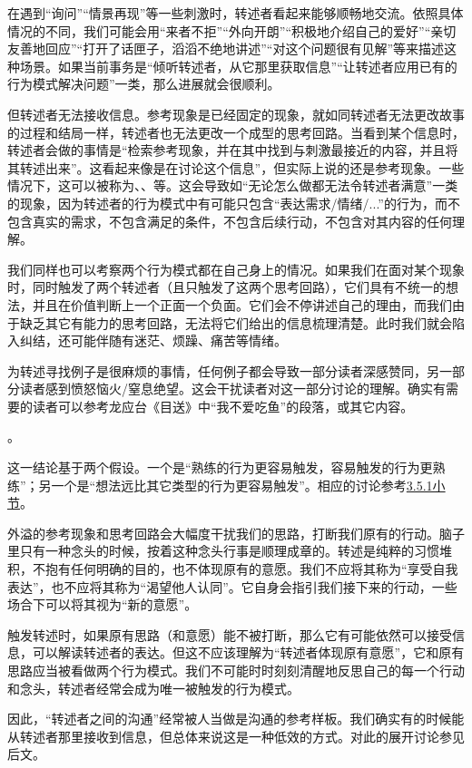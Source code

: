 \begin{explain}
在遇到“询问”“情景再现”等一些刺激时，转述者看起来能够顺畅地交流。依照具体情况的不同，我们可能会用“来者不拒”“外向开朗”“积极地介绍自己的爱好”“亲切友善地回应”“打开了话匣子，滔滔不绝地讲述”“对这个问题很有见解”等来描述这种场景。如果当前事务是“倾听转述者，从它那里获取信息”“让转述者应用已有的行为模式解决问题”一类，那么进展就会很顺利。

但转述者无法接收信息。参考现象是已经固定的现象，就如同转述者无法更改故事的过程和结局一样，转述者也无法更改一个成型的思考回路。当看到某个信息时，转述者会做的事情是“检索参考现象，并在其中找到与刺激最接近的内容，并且将其转述出来”。这看起来像是在讨论这个信息”，但实际上说的还是参考现象。一些情况下，这可以被称为、、等。这会导致如“无论怎么做都无法令转述者满意”一类的现象，因为转述者的行为模式中有可能只包含“表达需求/情绪/...”的行为，而不包含真实的需求，不包含满足的条件，不包含后续行动，不包含对其内容的任何理解。

我们同样也可以考察两个行为模式都在自己身上的情况。如果我们在面对某个现象时，同时触发了两个转述者（且只触发了这两个思考回路），它们具有不统一的想法，并且在价值判断上一个正面一个负面。它们会不停讲述自己的理由，而我们由于缺乏其它有能力的思考回路，无法将它们给出的信息梳理清楚。此时我们就会陷入纠结，还可能伴随有迷茫、烦躁、痛苦等情绪。

为转述寻找例子是很麻烦的事情，任何例子都会导致一部分读者深感赞同，另一部分读者感到愤怒恼火/窒息绝望。这会干扰读者对这一部分讨论的理解。确实有需要的读者可以参考龙应台《目送》中“我不爱吃鱼”的段落，或其它内容。
\end{explain}
。
\begin{explain}
这一结论基于两个假设。一个是“熟练的行为更容易触发，容易触发的行为更熟练”；另一个是“想法远比其它类型的行为更容易触发”。相应的讨论参考\hyperref[sec:想法的竞争与外溢]{3.5.1小节}。

外溢的参考现象和思考回路会大幅度干扰我们的思路，打断我们原有的行动。脑子里只有一种念头的时候，按着这种念头行事是顺理成章的。转述是纯粹的习惯堆积，不抱有任何明确的目的，也不体现原有的意愿。我们不应将其称为“享受自我表达”，也不应将其称为“渴望他人认同”。它自身会指引我们接下来的行动，一些场合下可以将其视为“新的意愿”。

触发转述时，如果原有思路（和意愿）能不被打断，那么它有可能依然可以接受信息，可以解读转述者的表达。但这不应该理解为“转述者体现原有意愿”，它和原有思路应当被看做两个行为模式。我们不可能时时刻刻清醒地反思自己的每一个行动和念头，转述者经常会成为唯一被触发的行为模式。

因此，“转述者之间的沟通”经常被人当做是沟通的参考样板。我们确实有的时候能从转述者那里接收到信息，但总体来说这是一种低效的方式。对此的展开讨论参见后文。
\end{explain}
